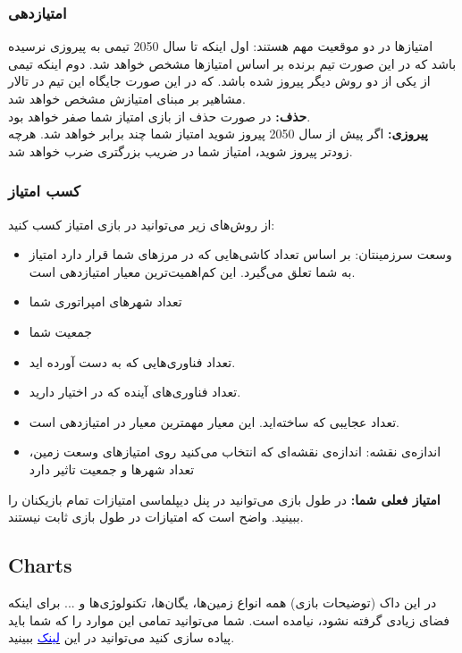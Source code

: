 \documentclass[]{article}
\begin{document}
\subsubsection*{{\titr امتیازدهی}}
امتیازها در دو موقعیت مهم هستند: اول اینکه تا سال 2050 تیمی به پیروزی نرسیده باشد که در این صورت تیم برنده بر اساس امتیازها مشخص خواهد شد. دوم اینکه تیمی از یکی از دو روش دیگر پیروز شده باشد. که در این صورت جایگاه این تیم در تالار مشاهیر بر مبنای امتیازش مشخص خواهد شد.
\\\noindent \textbf{حذف:} در صورت حذف از بازی امتیاز شما صفر خواهد بود.
\\\noindent \textbf{پیروزی:} اگر پیش از سال 2050 پیروز شوید امتیاز شما چند برابر خواهد شد. هرچه زودتر پیروز شوید، امتیاز شما در ضریب بزرگتری ضرب خواهد شد.

\subsubsection*{{\titr کسب امتیاز}}
از روش‌های زیر می‌توانید در بازی امتیاز کسب کنید:
\begin{itemize}
	\item وسعت سرزمینتان: بر اساس تعداد کاشی‌هایی که در مرزهای شما قرار دارد امتیاز به شما تعلق می‌گیرد. این کم‌اهمیت‌ترین معیار امتیازدهی است.
	\item تعداد شهرهای امپراتوری شما
	\item جمعیت شما
	\item تعداد فناوری‌هایی که به دست آورده اید.
	\item تعداد فناوری‌های آینده که در اختیار دارید.
	\item تعداد عجایبی که ساخته‌اید. این معیار مهمترین معیار در امتیازدهی است.
	\item اندازه‌ی نقشه: اندازه‌ی نقشه‌ای که انتخاب می‌کنید روی امتیازهای وسعت زمین، تعداد شهرها و جمعیت تاثیر دارد
\end{itemize}
\noindent \textbf{امتیاز فعلی شما:}  در طول بازی می‌توانید در پنل دیپلماسی امتیازات تمام بازیکنان را ببینید. واضح است که امتیازات در طول بازی ثابت نیستند.

\subsection*{{\titr Charts}}
در این داک (توضیحات بازی) همه انواع زمین‌ها، یگان‌ها، تکنولوژی‌ها و ... برای اینکه فضای زیادی گرفته نشود، نیامده است. شما می‌توانید تمامی این موارد را که شما باید پیاده سازی کنید می‌توانید در این 
 \href{https://docs.google.com/document/d/1nc7O3lcWN0OBdwXdwG6vOVuhLKdcxOnMXKr27-Cr8h8/edit?usp=sharing}{\textcolor{blue}{لینک}}
 ببینید.
\end{document}
